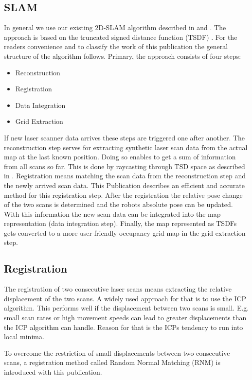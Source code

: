 \documentclass[conference]{IEEEtran}
\begin{document}
\subsection{SLAM}
In general we use our existing 2D-SLAM algorithm described in \cite{Koch2015} and \cite{May2014}. The approach is based on the truncated signed distance function (TSDF) . For the readers convenience and to classify the work of this publication the general structure of the algorithm follows. Primary, the approach consists of four steps: 
\begin{itemize}
	\item Reconstruction
	\item Registration
	\item Data Integration
	\item Grid Extraction
\end{itemize}
If new laser scanner data  arrives these steps are triggered one after another. The reconstruction step serves for extracting synthetic laser scan data from the actual map at the last known position. Doing so enables to get a sum of information from all scans so far. This is done by raycasting through TSD space as described in \cite{May2014}. Registration means matching the scan data from the reconstruction step and the newly arrived scan data. This Publication describes an efficient and accurate method for this registration step. After the registration the relative pose change of the two scans is determined and the robots absolute pose can be updated. With this information the new scan data can be integrated into the map representation (data integration step). Finally, the map represented as TSDFs gets converted to a more user-friendly occupancy grid map in the grid extraction step. \cite{May2014}

\subsection{Registration}
The registration of two consecutive laser scans means extracting the relative displacement of the two scans. A widely used approach for that is to use the ICP algorithm. This performs well if the displacement between two scans is small. E.g. small scan rates or high movement speeds can lead to greater displacements than the ICP algorithm can handle. Reason for that is the ICPs tendency to run into local minima. 

To overcome the restriction of small displacements between two consecutive scans, a registration method called Random Normal Matching (RNM) is introduced with this publication.
\end{document}
